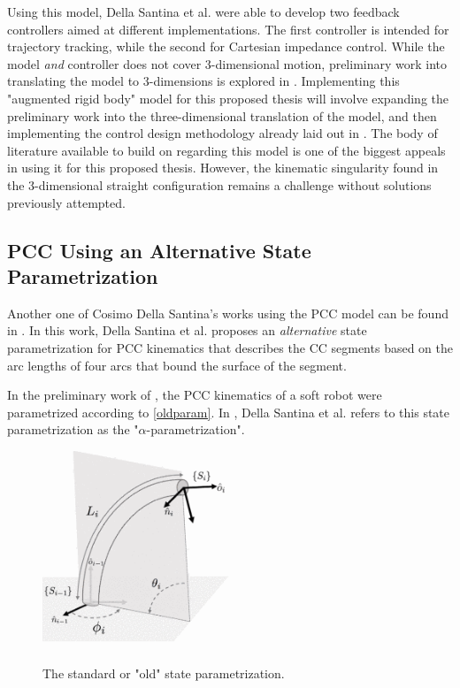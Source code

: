 Using this model, Della Santina et al. were able to develop two feedback controllers aimed at different implementations. The first controller is intended for trajectory tracking, while the second for Cartesian impedance control. While the model \textit{and} controller does not cover 3-dimensional motion, preliminary work into translating the model to 3-dimensions is explored in \cite{katzschmann_dynamic_2019}. Implementing this "augmented rigid body" model for this proposed thesis will involve expanding the preliminary work into the three-dimensional translation of the model, and then implementing the control design methodology already laid out in \cite{della_santina_model-based_2020}. The body of literature available to build on regarding this model is one of the biggest appeals in using it for this proposed thesis. However, the kinematic singularity found in the 3-dimensional straight configuration remains a challenge without solutions previously attempted.
\subsection{PCC Using an Alternative State Parametrization}
Another one of Cosimo Della Santina's works using the PCC model can be found in \cite{della_santina_improved_2020}. In this work, Della Santina et al. proposes an \textit{alternative} state parametrization for PCC kinematics that describes the CC segments based on the arc lengths of four arcs that bound the surface of the segment.

In the preliminary work of \cite{katzschmann_dynamic_2019}, the PCC kinematics of a soft robot were parametrized according to \autoref{oldparam}. In \cite{della_santina_improved_2020}, Della Santina et al. refers to this state parametrization as the "$\alpha$-parametrization". 

\begin{figure}[h!]
    \centering
    \includegraphics[width=0.5\textwidth]{graphics/oldparam.png}\
    \caption{The standard or "old" state parametrization. }
    \label{oldparam}
\end{figure}


